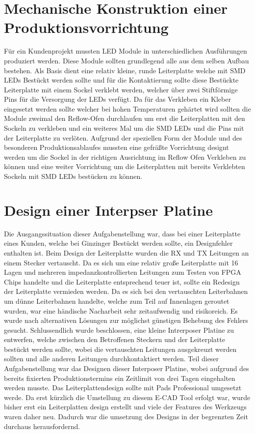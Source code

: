 \documentclass[praktikum,german]{hgbthesis}
\begin{document}
\section{Mechanische Konstruktion einer Produktionsvorrichtung}
Für ein Kundenprojekt mussten LED Module in unterschiedlichen Ausführungen produziert werden. Diese Module sollten grundlegend alle aus dem selben Aufbau bestehen. Als Basis dient eine relativ kleine, runde Leiterplatte welche mit SMD LEDs Bestückt werden sollte und für die Kontaktierung sollte diese Bestückte Leiterplatte mit einem Sockel verklebt werden, welcher über zwei Stiftförmige Pins für die Versorgung der LEDs verfügt. Da für das Verkleben ein Kleber eingesetzt werden sollte welcher bei hohen Temperaturen gehärtet wird sollten die Module zweimal den Reflow-Ofen durchlaufen um erst die Leiterplatten mit den Sockeln zu verkleben und ein weiteres Mal um die SMD LEDs und die Pins mit der Leiterplatte zu verlöten. Aufgrund der speziellen Form der Module und des besonderen Produktionsablaufes mussten eine gefräßte Vorrichtung designt werden um die Sockel in der richtigen Ausrichtung im Reflow Ofen Verkleben zu können und eine weiter Vorrichtung um die Leiterplatten mit bereits Verklebten Sockeln mit SMD LEDs bestücken zu können.

\section{Design einer Interpser Platine}
Die Ausgangssituation dieser Aufgabenstellung war, dass bei einer Leiterplatte eines Kunden, welche bei Ginzinger Bestückt werden sollte, ein Designfehler enthalten ist. Beim Design der Leiterplatte wurden die RX und TX Leitungen an einem Stecker vertauscht. Da es sich um eine relativ große Leiterplatte mit 16 Lagen und mehreren impedanzkontrollierten Leitungen zum Testen von FPGA Chips handelte und die Leiterplatte entsprechend teuer ist, sollte ein Redesign der Leiterplatte vermieden werden. Da es sich bei den vertauschten Leiterbahnen um dünne Leiterbahnen handelte, welche zum Teil auf Innenlagen geroutet wurden, war eine händische Nacharbeit sehr zeitaufwendig und risikoreich. Es wurde nach alternativen Lösungen zur möglichst günstigen Behebung des Fehlers gesucht. Schlussendlich wurde beschlossen, eine kleine Intrerposer Platine zu entwerfen, welche zwischen den Betroffenen Steckern und der Leiterplatte bestückt werden sollte, wobei die vertauschten Leitungen ausgekreuzt werden sollten und alle anderen Leitungen durchkontaktiert werden.
Teil dieser Aufgabenstellung war das Designen dieser Interposer Platine, wobei aufgrund des bereits fixierten Produktionstermins ein Zeitlimit von drei Tagen eingehalten werden musste.
Das Leiterplattendesign sollte mit Pads Professional umgesetzt werde. Da erst kürzlich die Umstellung zu diesem E-CAD Tool erfolgt war, wurde bisher erst ein Leiterplatten design erstellt und viele der Features des Werkzeugs waren daher neu. Dadurch war die umsetzung des Designs in der begrenzten Zeit durchaus herausfordernd. 
\end{document}
